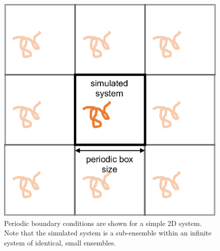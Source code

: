\documentclass[9pt,bestpractices]{livecoms}
\begin{document}
\begin{figure}[h]
\centering
\includegraphics[width=\linewidth]{PBC_figure.pdf}
\caption{Periodic boundary conditions are shown for a simple 2D system. Note that the simulated system is a sub-ensemble within an infinite system of identical, small ensembles.}
\label{pbcfig}
\end{figure}
\end{document}
